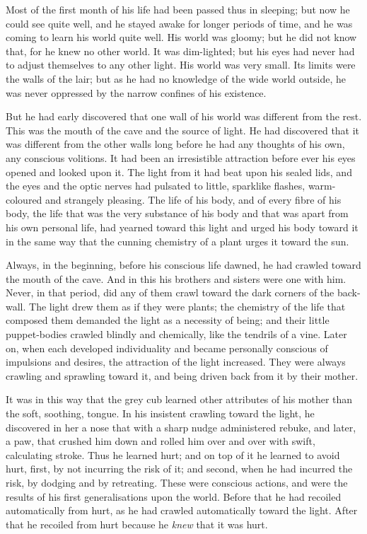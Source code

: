 \documentclass[10pt]{book}
\begin{document}
Most of the first month of his life had been passed thus in sleeping;
but now he could see quite well, and he stayed awake for longer periods
of time, and he was coming to learn his world quite well. His world was
gloomy; but he did not know that, for he knew no other world. It was
dim-lighted; but his eyes had never had to adjust themselves to any
other light. His world was very small. Its limits were the walls of the
lair; but as he had no knowledge of the wide world outside, he was
never oppressed by the narrow confines of his existence.

But he had early discovered that one wall of his world was different
from the rest. This was the mouth of the cave and the source of light.
He had discovered that it was different from the other walls long
before he had any thoughts of his own, any conscious volitions. It had
been an irresistible attraction before ever his eyes opened and looked
upon it. The light from it had beat upon his sealed lids, and the eyes
and the optic nerves had pulsated to little, sparklike flashes,
warm-coloured and strangely pleasing. The life of his body, and of
every fibre of his body, the life that was the very substance of his
body and that was apart from his own personal life, had yearned toward
this light and urged his body toward it in the same way that the
cunning chemistry of a plant urges it toward the sun.

Always, in the beginning, before his conscious life dawned, he had
crawled toward the mouth of the cave. And in this his brothers and
sisters were one with him. Never, in that period, did any of them crawl
toward the dark corners of the back-wall. The light drew them as if
they were plants; the chemistry of the life that composed them demanded
the light as a necessity of being; and their little puppet-bodies
crawled blindly and chemically, like the tendrils of a vine. Later on,
when each developed individuality and became personally conscious of
impulsions and desires, the attraction of the light increased. They
were always crawling and sprawling toward it, and being driven back
from it by their mother.

It was in this way that the grey cub learned other attributes of his
mother than the soft, soothing, tongue. In his insistent crawling
toward the light, he discovered in her a nose that with a sharp nudge
administered rebuke, and later, a paw, that crushed him down and rolled
him over and over with swift, calculating stroke. Thus he learned hurt;
and on top of it he learned to avoid hurt, first, by not incurring the
risk of it; and second, when he had incurred the risk, by dodging and
by retreating. These were conscious actions, and were the results of
his first generalisations upon the world. Before that he had recoiled
automatically from hurt, as he had crawled automatically toward the
light. After that he recoiled from hurt because he \emph{knew} that it was
hurt.
\end{document}
